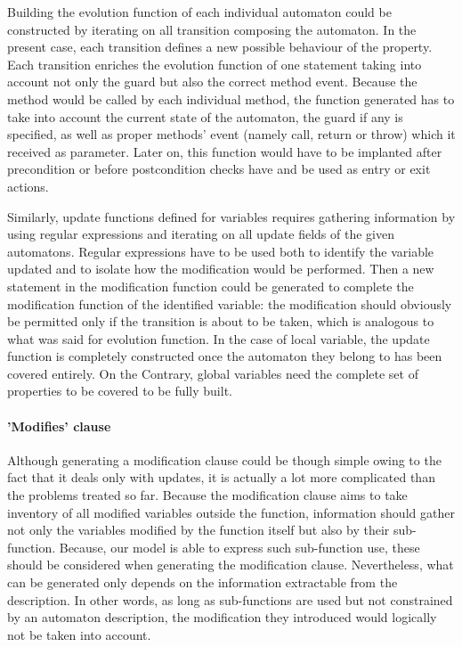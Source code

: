 Building the evolution function of each individual automaton could be constructed by iterating on all transition composing the automaton. In the present case, each transition defines a new possible behaviour of the property. Each transition enriches the evolution function of one statement taking into account not only the guard but also the correct method event. Because the method would be called by each individual method, the function generated has to take into account the current state of the automaton, the guard if any is specified, as well as proper methods' event (namely call, return or throw) which it received as parameter. Later on, this function would have to be implanted after precondition or before postcondition checks have and be used as entry or exit actions. 

Similarly, update functions defined for variables requires gathering information by using regular expressions and iterating on all update fields of the given automatons. Regular expressions have to be used both to identify the variable updated and to isolate how the modification would be performed. Then a new statement in the modification function could be generated to complete the modification function of the identified variable: the modification should obviously be permitted only if the transition is about to be taken, which is analogous to what was said for evolution function. In the case of local variable, the update function is completely constructed once the automaton they belong to has been covered entirely. On the Contrary, global variables need the complete set of properties to be covered to be fully built.

\paragraph{'Modifies' clause}
Although generating a modification clause could be though simple owing to the fact that it deals only with updates, it is actually a lot more complicated than the problems treated so far. Because the modification clause aims to take inventory of all modified variables outside the function, information should gather not only the variables modified by the function itself but also by their sub-function. Because, our model is able to express such sub-function use, these should be considered when generating the modification clause. Nevertheless, what can be generated only depends on the information extractable from the description. In other words, as long as sub-functions are used but not constrained by an automaton description, the modification they introduced would logically not be taken into account. 

